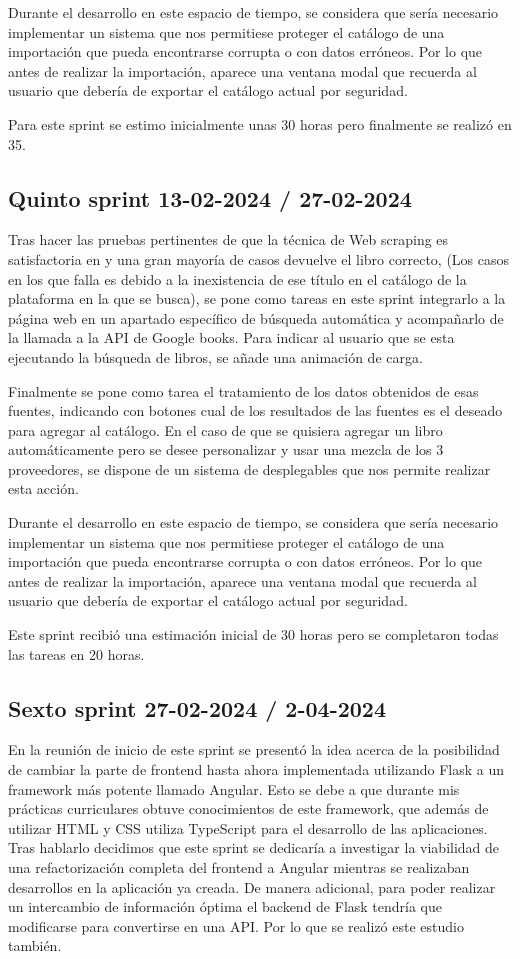 Durante el desarrollo en este espacio de tiempo, se considera que sería necesario implementar un sistema que nos permitiese proteger el catálogo de una importación que pueda encontrarse corrupta o con datos erróneos.
Por lo que antes de realizar la importación, aparece una ventana modal que recuerda al usuario que debería de exportar el catálogo actual por seguridad.

Para este sprint se estimo inicialmente unas 30 horas pero finalmente se realizó en 35.

\subsection{Quinto sprint 13-02-2024 / 27-02-2024}
Tras hacer las pruebas pertinentes de que la técnica de Web scraping es satisfactoria en y una gran mayoría de casos devuelve el libro correcto, (Los casos en los que falla es debido a la inexistencia de ese título en el catálogo de la plataforma en la que se busca), se pone como tareas en este sprint integrarlo a la página web en un apartado específico de búsqueda automática y acompañarlo de la llamada a la API de Google books. Para indicar al usuario que se esta ejecutando la búsqueda de libros, se añade una animación de carga.

Finalmente se pone como tarea el tratamiento de los datos obtenidos de esas fuentes, indicando con botones cual de los resultados de las fuentes es el deseado para agregar al catálogo.
En el caso de que se quisiera agregar un libro automáticamente pero se desee personalizar y usar una mezcla de los 3 proveedores, se dispone de un sistema de desplegables que nos permite realizar esta acción.

Durante el desarrollo en este espacio de tiempo, se considera que sería necesario implementar un sistema que nos permitiese proteger el catálogo de una importación que pueda encontrarse corrupta o con datos erróneos.
Por lo que antes de realizar la importación, aparece una ventana modal que recuerda al usuario que debería de exportar el catálogo actual por seguridad.

Este sprint recibió una estimación inicial de 30 horas pero se completaron todas las tareas en 20 horas.

\subsection{Sexto sprint 27-02-2024 / 2-04-2024}
En la reunión de inicio de este sprint se presentó la idea acerca de la posibilidad de cambiar la parte de frontend hasta ahora implementada utilizando Flask a un framework más potente llamado Angular. Esto se debe a que durante mis prácticas curriculares obtuve conocimientos de este framework, que además de utilizar HTML y CSS utiliza TypeScript para el desarrollo de las aplicaciones.
Tras hablarlo decidimos que este sprint se dedicaría a investigar la viabilidad de una refactorización completa del frontend a Angular mientras se realizaban desarrollos en la aplicación ya creada. 
De manera adicional, para poder realizar un intercambio de información óptima el backend de Flask tendría que modificarse para convertirse en una API. Por lo que se realizó este estudio también.

